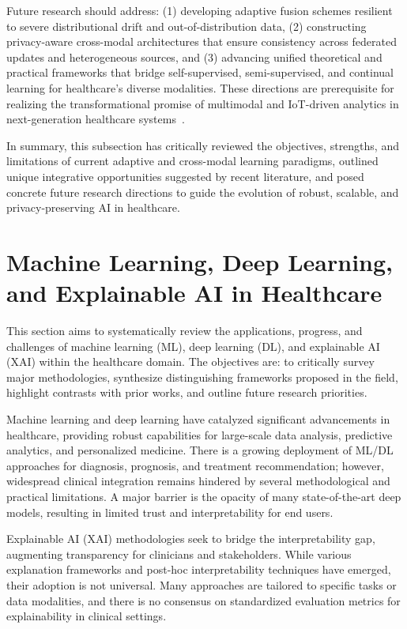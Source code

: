 \documentclass[sigconf]{acmart}
\begin{document}
Future research should address: (1) developing adaptive fusion schemes resilient to severe distributional drift and out-of-distribution data, (2) constructing privacy-aware cross-modal architectures that ensure consistency across federated updates and heterogeneous sources, and (3) advancing unified theoretical and practical frameworks that bridge self-supervised, semi-supervised, and continual learning for healthcare’s diverse modalities. These directions are prerequisite for realizing the transformational promise of multimodal and IoT-driven analytics in next-generation healthcare systems~\cite{ref104,ref105,ref106,ref107}.

In summary, this subsection has critically reviewed the objectives, strengths, and limitations of current adaptive and cross-modal learning paradigms, outlined unique integrative opportunities suggested by recent literature, and posed concrete future research directions to guide the evolution of robust, scalable, and privacy-preserving AI in healthcare.

\section{Machine Learning, Deep Learning, and Explainable AI in Healthcare}

This section aims to systematically review the applications, progress, and challenges of machine learning (ML), deep learning (DL), and explainable AI (XAI) within the healthcare domain. The objectives are: to critically survey major methodologies, synthesize distinguishing frameworks proposed in the field, highlight contrasts with prior works, and outline future research priorities.

Machine learning and deep learning have catalyzed significant advancements in healthcare, providing robust capabilities for large-scale data analysis, predictive analytics, and personalized medicine. There is a growing deployment of ML/DL approaches for diagnosis, prognosis, and treatment recommendation; however, widespread clinical integration remains hindered by several methodological and practical limitations. A major barrier is the opacity of many state-of-the-art deep models, resulting in limited trust and interpretability for end users.

Explainable AI (XAI) methodologies seek to bridge the interpretability gap, augmenting transparency for clinicians and stakeholders. While various explanation frameworks and post-hoc interpretability techniques have emerged, their adoption is not universal. Many approaches are tailored to specific tasks or data modalities, and there is no consensus on standardized evaluation metrics for explainability in clinical settings.
\end{document}
